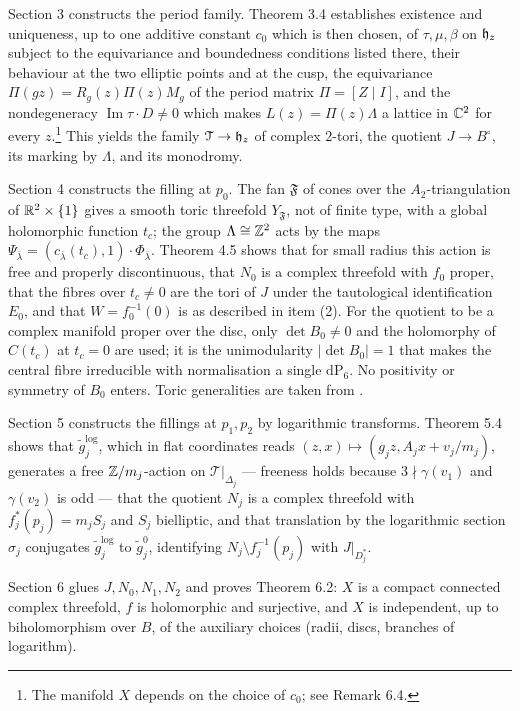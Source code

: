 Section 3 constructs the period family. Theorem 3.4 establishes existence and uniqueness, up to one additive constant $c_0$ which is then chosen, of $\tau,\mu,\beta$ on $\mathfrak{h}_z$ subject to the equivariance and boundedness conditions listed there, their behaviour at the two elliptic points and at the cusp, the equivariance $\Pi(gz) = R_g(z)\Pi(z)M_g$ of the period matrix $\Pi = [Z \mid I]$, and the nondegeneracy $\operatorname{Im}\tau \cdot D \ne 0$ which makes $L(z) = \Pi(z)\Lambda$ a lattice in $\mathbb{C}^2$ for every $z$.\footnote{The manifold $X$ depends on the choice of $c_0$; see Remark 6.4.} This yields the family $\mathcal T \to \mathfrak{h}_z$ of complex $2$-tori, the quotient $J \to B^\circ$, its marking by $\Lambda$, and its monodromy.

Section 4 constructs the filling at $p_0$. The fan $\mathfrak F$ of cones over the $A_2$-triangulation of $\mathbb{R}^2 \times \{1\}$ gives a smooth toric threefold $Y_{\mathfrak F}$, not of finite type, with a global holomorphic function $t_c$; the group $\Lambda \cong \mathbb{Z}^2$ acts by the maps $\Psi_{\bar\lambda} = (c_{\bar\lambda}(t_c),1)\cdot \Phi_{\bar\lambda}$. Theorem 4.5 shows that for small radius this action is free and properly discontinuous, that $N_0$ is a complex threefold with $f_0$ proper, that the fibres over $t_c \ne 0$ are the tori of $J$ under the tautological identification $E_0$, and that $W = f_0^{-1}(0)$ is as described in item (2). For the quotient to be a complex manifold proper over the disc, only $\det B_0 \ne 0$ and the holomorphy of $C(t_c)$ at $t_c = 0$ are used; it is the unimodularity $|\det B_0| = 1$ that makes the central fibre irreducible with normalisation a single $\mathrm{dP}_6$. No positivity or symmetry of $B_0$ enters. Toric generalities are taken from \cite{Ful93,Oda88,KKMS}.

Section 5 constructs the fillings at $p_1, p_2$ by logarithmic transforms. Theorem 5.4 shows that $\tilde g_j^{\log}$, which in flat coordinates reads $(z,x) \mapsto (g_j z, A_j x + v_j/m_j)$, generates a free $\mathbb{Z}/m_j$-action on $\mathcal T|_{\Delta_j}$ --- freeness holds because $3 \nmid \gamma(v_1)$ and $\gamma(v_2)$ is odd --- that the quotient $N_j$ is a complex threefold with $f_j^*(p_j) = m_j S_j$ and $S_j$ bielliptic, and that translation by the logarithmic section $\sigma_j$ conjugates $\tilde g_j^{\log}$ to $\tilde g_j^0$, identifying $N_j \setminus f_j^{-1}(p_j)$ with $J|_{D_j^*}$.

Section 6 glues $J, N_0, N_1, N_2$ and proves Theorem 6.2: $X$ is a compact connected complex threefold, $f$ is holomorphic and surjective, and $X$ is independent, up to biholomorphism over $B$, of the auxiliary choices (radii, discs, branches of logarithm).

